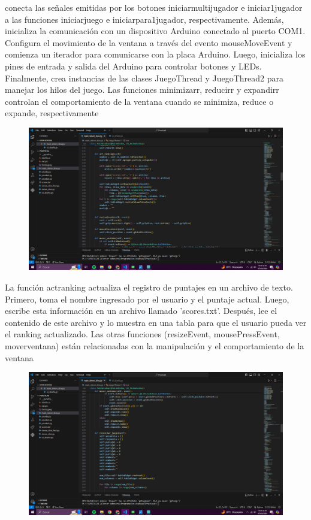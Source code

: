 \documentclass{article}
\begin{document}
{{\begin{figure}[h]
\end{figure}

{\Large conecta las señales emitidas por los botones iniciarmultijugador e iniciar1jugador a las funciones iniciarjuego e iniciarpara1jugador, respectivamente. Además, inicializa la comunicación con un dispositivo Arduino conectado al puerto COM1. Configura el movimiento de la ventana a través del evento mouseMoveEvent y comienza un iterador para comunicarse con la placa Arduino. Luego, inicializa los pines de entrada y salida del Arduino para controlar botones y LEDs. Finalmente, crea instancias de las clases JuegoThread y JuegoThread2 para manejar los hilos del juego. Las funciones minimizarr, reducirr y expandirr controlan el comportamiento de la ventana cuando se minimiza, reduce o expande, respectivamente

}

\newpage
\begin{figure}[h]
    \centering
    \includegraphics[width=1\textwidth]{Captura de pantalla (768).png}
    
\end{figure}

{\Large La función actranking actualiza el registro de puntajes en un archivo de texto. Primero, toma el nombre ingresado por el usuario y el puntaje actual. Luego, escribe esta información en un archivo llamado 'scores.txt'. Después, lee el contenido de este archivo y lo muestra en una tabla para que el usuario pueda ver el ranking actualizado. Las otras funciones (resizeEvent, mousePressEvent, moverventana) están relacionadas con la manipulación y el comportamiento de la ventana
}

\newpage
\begin{figure}[h]
    \centering
    \includegraphics[width=1\textwidth]{Captura de pantalla (769).png}
    

\end{figure}}}
\end{document}
